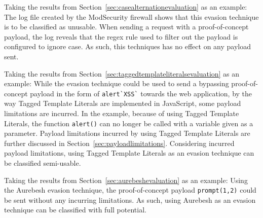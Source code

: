 Taking the results from Section~\ref{sec:casealternationevaluation} as an example: The log file created by the ModSecurity firewall shows that this evasion technique is to be classified as unusable. When sending a request with a proof-of-concept payload, the log reveals that the regex rule used to filter out the payload is configured to ignore case. As such, this techniques has no effect on any payload sent.

Taking the results from Section~\ref{sec:taggedtemplateliteralsevaluation} as an example: While the evasion technique could be used to send a bypassing proof-of-concept payload in the form of \verb|alert`XSS`| towards the web application, by the way Tagged Template Literals are implemented in JavaScript, some payload limitations are incurred. In the example, because of using Tagged Template Literals, the function \verb|alert()| can no longer be called with a variable given as a parameter. Payload limitations incurred by using Tagged Template Literals are further discussed in Section~\ref{sec:payloadlimitations}. Considering incurred payload limitations, using Tagged Template Literals as an evasion technique can be classified semi-usable.

Taking the results from Section~\ref{sec:aurebeshevaluation} as an example: Using the Aurebesh evasion technique, the proof-of-concept payload \verb|prompt(1,2)| could be sent without any incurring limitations. As such, using Aurebesh as an evasion technique can be classified with full potential.

